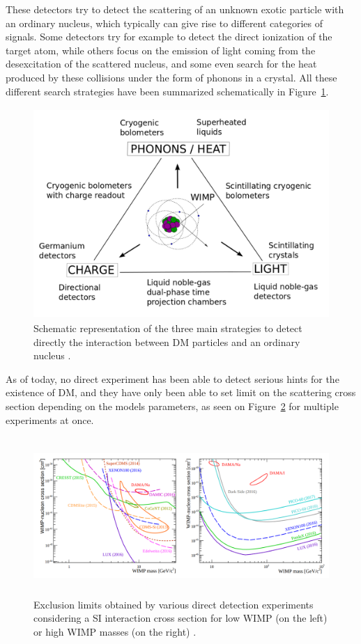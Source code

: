 \documentclass[a4paper, 10pt, openright]{report}
\begin{document}
These detectors try to detect the scattering of an unknown exotic particle with an ordinary nucleus, which typically can give rise to different categories of signals. Some detectors try for example to detect the direct ionization of the target atom, while others focus on the emission of light coming from the desexcitation of the scattered nucleus, and some even search for the heat produced by these collisions under the form of phonons in a crystal. All these different search strategies have been summarized schematically in Figure~\ref{figure:DirectWays}.

\begin{figure}[htbp]
\begin{center}
\includegraphics[width=12cm, height=8cm]{figs/DirectWays.png}
\caption{Schematic representation of the three main strategies to detect directly the interaction between \ac{DM} particles and an ordinary nucleus \cite{DirectWays}.}
\label{figure:DirectWays}
\end{center}
\end{figure}

As of today, no direct experiment has been able to detect serious hints for the existence of \ac{DM}, and they have only been able to set limit on the scattering cross section depending on the models parameters, as seen on Figure~\ref{fig:DirectLimits} for multiple experiments at once.

\begin{figure}[htbp]
\begin{center}
\includegraphics[width=14cm, height=6cm]{figs/DirectLimits.png}
\caption{Exclusion limits obtained by various direct detection experiments considering a \ac{SI} interaction cross section for low \ac{WIMP} (on the left) or high \ac{WIMP} masses (on the right) \cite{DirectWays}.}
\label{fig:DirectLimits}
\end{center}
\end{figure}
\end{document}
